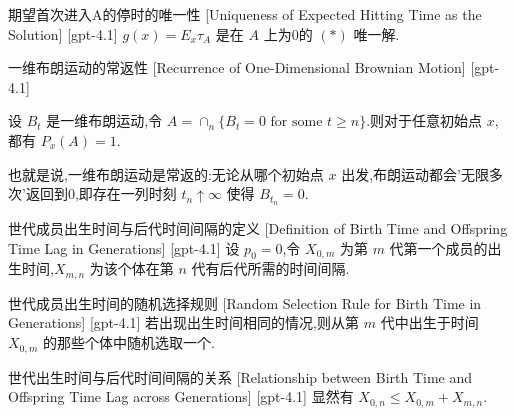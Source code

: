 \documentclass[UTF8]{ctexart}
\begin{document}
    
    
    \begin{thm}
        {期望首次进入A的停时的唯一性}
        [Uniqueness of Expected Hitting Time as the Solution]
        [gpt-4.1]
        $g(x) = E_{x} \tau_{A}$ 是在 $A$ 上为0的 $(*)$ 唯一解.
    \end{thm}
    
    
    
    \begin{thm}
        {一维布朗运动的常返性}
        [Recurrence of One-Dimensional Brownian Motion]
        [gpt-4.1]
        
设 $B_t$ 是一维布朗运动,令 $A = \cap_{n} \{ B_t = 0 \text{ for some } t \geq n \}$.则对于任意初始点 $x$,都有 $P_x(A) = 1$.

也就是说,一维布朗运动是常返的:无论从哪个初始点 $x$ 出发,布朗运动都会'无限多次'返回到0,即存在一列时刻 $t_n \uparrow \infty$ 使得 $B_{t_n} = 0$.

    \end{thm}
    
    
    
    \begin{dfn}
        {世代成员出生时间与后代时间间隔的定义}
        [Definition of Birth Time and Offspring Time Lag in Generations]
        [gpt-4.1]
        设 $p_{0} = 0$,令 $X_{0, m}$ 为第 $m$ 代第一个成员的出生时间,$X_{m, n}$ 为该个体在第 $n$ 代有后代所需的时间间隔.
    \end{dfn}
    
    
    
    \begin{ppt}
        {世代成员出生时间的随机选择规则}
        [Random Selection Rule for Birth Time in Generations]
        [gpt-4.1]
        若出现出生时间相同的情况,则从第 $m$ 代中出生于时间 $X_{0, m}$ 的那些个体中随机选取一个.
    \end{ppt}
    
    
    
    \begin{ppt}
        {世代出生时间与后代时间间隔的关系}
        [Relationship between Birth Time and Offspring Time Lag across Generations]
        [gpt-4.1]
        显然有 $X_{0, n} \leq X_{0, m} + X_{m, n}$.
    \end{ppt}
    
\end{document}
